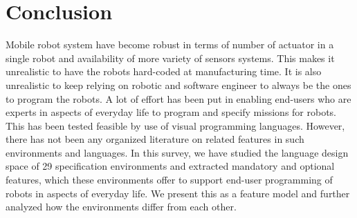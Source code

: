 \section{Conclusion}
Mobile robot system have become robust in terms of number of actuator in a single robot and  availability of more variety of sensors systems. This makes it unrealistic to have the robots hard-coded at manufacturing time. It is also unrealistic to keep relying on robotic and software engineer to always be the ones to program the robots. A lot of effort has been put in enabling end-users who are experts in aspects of everyday life to program and specify missions for robots. This has been tested feasible by use of visual programming languages. However, there has not been any organized literature on related features in such environments and languages. In this survey, we have studied the language design space of 29 specification environments and extracted mandatory and optional features, which these environments offer to support end-user programming of robots in aspects of everyday life. We present this as a feature model and further analyzed how the environments differ from each other.   

